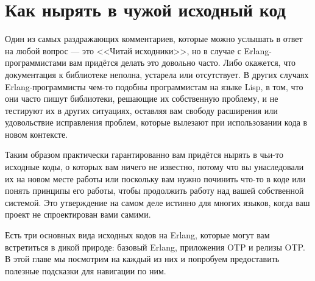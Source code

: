 \chapter{Как нырять в чужой исходный код}
\label{chap:how-to-dive-into-a-code-base}

Один из самых раздражающих комментариев, которые можно услышать в ответ на любой вопрос --- это <<Читай исходники>>, но в случае с Erlang-программистами вам придётся делать это довольно часто. Либо окажется, что документация к библиотеке неполна, устарела или отсутствует. В других случаях Erlang-программисты чем-то подобны программистам на языке Lisp, в том, что они часто пишут библиотеки, решающие их собственную проблему, и не тестируют их в других ситуациях, оставляя вам свободу расширения или удовольствие исправления проблем, которые вылезают при использовании кода в новом контексте.

Таким образом практически гарантированно вам придётся нырять в чьи-то исходные коды, о которых вам ничего не известно, потому что вы унаследовали их на новом месте работы или поскольку вам нужно починить что-то в коде или понять принципы его работы, чтобы продолжить работу над вашей собственной системой. Это утверждение на самом деле истинно для многих языков, когда ваш проект не спроектирован вами самими.

Есть три основных вида исходных кодов на Erlang, которые могут вам встретиться в дикой природе: базовый Erlang, приложения OTP и релизы OTP. В этой главе мы посмотрим на каждый из них и попробуем предоставить полезные подсказки для навигации по ним.



